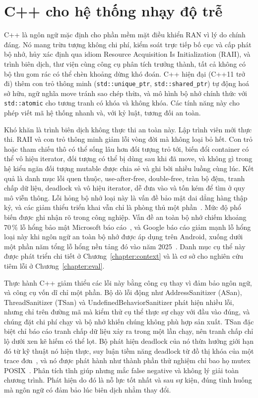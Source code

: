 \section{C++ cho hệ thống nhạy độ trễ}\label{sec:cpplatency}
C++ là ngôn ngữ mặc định cho phần mềm mặt điều khiển RAN vì lý do chính đáng. Nó mang trừu
tượng không chi phí, kiểm soát trực tiếp bố cục và cấp phát bộ nhớ, hủy xác định qua idiom
Resource Acquisition Is Initialization (RAII), và trình biên dịch, thư viện cùng công cụ phân
tích trưởng thành, tất cả không có bộ thu gom rác có thể chèn khoảng dừng khó đoán. C++ hiện
đại (C++11 trở đi) thêm con trỏ thông minh (\texttt{std::unique\_ptr}, \texttt{std::shared\_ptr})
tự động hoá sở hữu, ngữ nghĩa move tránh sao chép thừa, và mô hình bộ nhớ chính thức với
\texttt{std::atomic} cho tương tranh có khóa và không khóa. Các tính năng này cho phép viết mã
hệ thống nhanh và, với kỷ luật, tương đối an toàn.

Khó khăn là trình biên dịch không thực thi an toàn này. Lập trình viên mới thực thi. RAII và
con trỏ thông minh giảm lỗi vòng đời mà không loại bỏ hết. Con trỏ hoặc tham chiếu thô có thể
sống lâu hơn đối tượng trỏ tới, biến đổi container có thể vô hiệu iterator, đối tượng có thể
bị dùng sau khi đã move, và không gì trong hệ kiểu ngăn đối tượng mutable được chia sẻ và ghi
bởi nhiều luồng cùng lúc. Kết quả là danh mục lỗi quen thuộc, use-after-free, double-free, tràn
bộ đệm, tranh chấp dữ liệu, deadlock và vô hiệu iterator, dễ đưa vào và tốn kém để tìm ở quy
mô viễn thông. Lỗi hỏng bộ nhớ loại này là vấn đề bảo mật dai dẳng hàng thập kỷ, và các giảm
thiểu triển khai vẫn chỉ là phòng thủ một
phần~\cite{szekeres2013sok}. Mức độ phổ biến được ghi nhận rõ trong công nghiệp. Vấn đề an toàn
bộ nhớ chiếm khoảng 70\,\% lỗ hổng bảo mật Microsoft
báo cáo~\cite{msrc2019memory}, và Google báo cáo giảm mạnh lỗ hổng loại này khi ngôn ngữ an
toàn bộ nhớ được áp dụng trên Android, xuống dưới một phần năm tổng lỗ hổng nền tảng đó vào
năm 2025~\cite{google2022android,vanderstoep2025android}. Danh mục cụ thể này được phát triển
chi tiết ở Chương~\ref{chapter:context} và là cơ sở cho nghiên cứu tiêm lỗi ở
Chương~\ref{chapter:eval}.

Thực hành C++ giảm thiểu các lỗi này bằng công cụ thay vì đảm bảo ngôn ngữ, và công cụ vốn
dĩ chỉ một phần. Bộ dò lỗi động như AddressSanitizer (ASan), ThreadSanitizer (TSan) và
UndefinedBehaviorSanitizer phát hiện nhiều lỗi, nhưng chỉ trên đường mã mà kiểm thử cụ thể
thực sự chạy với đầu vào đúng, và chúng đặt chi phí chạy và bộ nhớ khiến chúng không phù hợp
sản xuất. TSan đặc biệt chỉ báo cáo tranh chấp dữ liệu xảy ra trong một lần chạy, nên tranh
chấp chỉ lộ dưới xen kẽ hiếm có thể lọt. Bộ phát hiện deadlock của nó thừa hưởng giới hạn đó
từ kỹ thuật nó hiện thực, suy luận tiềm năng deadlock từ đồ thị khóa của một trace
đơn~\cite{bensalem2005deadlock}, và nó được phát hành như thành phần thử nghiệm chỉ bao họ
mutex POSIX~\cite{tsandeadlock}. Phân tích tĩnh giúp nhưng mắc false negative và không lý
giải toàn chương trình. Phát hiện do đó là nỗ lực tốt nhất và sau sự kiện, đúng tình huống mà
ngôn ngữ có đảm bảo lúc biên dịch nhằm thay đổi.

